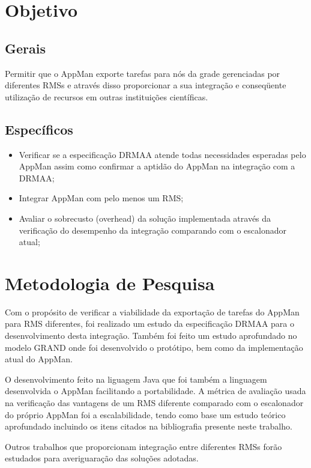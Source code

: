\section{Objetivo}

\subsection{Gerais}
Permitir que o AppMan exporte tarefas para nós da grade gerenciadas por diferentes RMSs e através disso proporcionar a sua integração e conseqüente utilização de recursos em outras instituições científicas.

\subsection{Específicos}
    \begin{itemize}
        \item Verificar se a especificação DRMAA atende todas necessidades esperadas pelo AppMan assim como confirmar a aptidão do AppMan na integração com a DRMAA;
        \item Integrar AppMan com pelo menos um RMS;
        \item Avaliar o sobrecusto (overhead) da solução implementada através da verificação do desempenho da integração comparando com o escalonador atual;
    \end{itemize}
    
\section{Metodologia de Pesquisa}    
Com o propósito de verificar a viabilidade da exportação de tarefas do AppMan para RMS diferentes, foi realizado um estudo da especificação DRMAA para o desenvolvimento desta integração. Também foi feito um estudo aprofundado no modelo GRAND onde foi desenvolvido o protótipo, bem como da implementação atual do AppMan.

O desenvolvimento feito na liguagem Java que foi também a linguagem desenvolvida o AppMan facilitando a portabilidade. A métrica de avaliação usada na verificação das vantagens de um RMS diferente comparado com o escalonador do próprio AppMan foi a escalabilidade,  tendo como base um estudo teórico aprofundado incluindo os itens citados na bibliografia presente neste trabalho.

Outros trabalhos que proporcionam integração entre diferentes RMSs forão estudados para averiguaração das soluções adotadas. 

